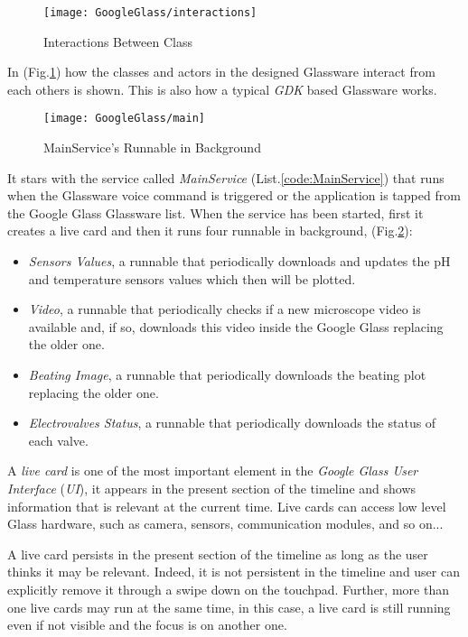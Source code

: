 \begin{figure}[h]
	\centering
	\texttt{[image: GoogleGlass/interactions]}
	\caption{Interactions Between Class}
	\label{Fig:interaction}
\end{figure}

In (Fig.\ref{Fig:interaction}) how the classes and actors in the designed Glassware interact from each others is shown. This is also how a typical \textit{GDK} based Glassware works.



\begin{figure}[b]
	\centering
	\texttt{[image: GoogleGlass/main]}
	\caption{MainService's Runnable in Background}
	\label{Fig:mainrun}
\end{figure}

It stars with the service called \textit{MainService} (List.\ref{code:MainService}) that runs when the Glassware voice command is triggered or the application is tapped from the Google Glass Glassware list. When the service has been started, first it creates a live card and then it runs four runnable in background, (Fig.\ref{Fig:mainrun}):
\begin{itemize}
	\item \textit{Sensors Values}, a runnable that periodically downloads and updates the pH and temperature sensors values which then will be plotted.
	\item \textit{Video}, a runnable that periodically checks if a new microscope video is available and, if so, downloads this video inside the Google Glass replacing the older one.
	\item \textit{Beating Image}, a runnable that periodically downloads the beating plot replacing the older one.
	\item \textit{Electrovalves Status}, a runnable that periodically downloads the status of each valve.
\end{itemize}

A \textit{live card} is one of the most important element in the \textit{Google Glass User Interface} (\textit{UI}), it appears in the present section of the timeline and shows information that is relevant at the current time. Live cards can access low level Glass hardware, such as camera, sensors, communication modules, and so on... 

A live card persists in the present section of the timeline as long as the user thinks it may be relevant. Indeed, it is not persistent in the timeline and user can explicitly remove it through a swipe down on the touchpad. Further, more than one live cards may run at the same time, in this case, a live card is still running even if not visible and the focus is on another one.

